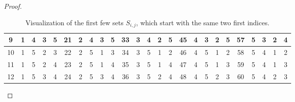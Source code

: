 \begin{proof}
\begin{table}[h]
{\begin{tabular}{||c | c c c c||c | c c c c||c | c c c c||c | c c c c||c | c c c c||}
				\hline
				9 & \cellcolor{-red!60!green}1 & \cellcolor{-red!60!green}4 & \cellcolor{-red!60!green}3 & \cellcolor{-red!60!green}5 & 21 & 2 & 4 & 3 & 5 & 33 & 3 & 4 & 2 & 5 & 45 & 4 & 3 & 2 & 5 & 57 & 5 & 3 & 2 & 4 \\ 
				\hline
				10 & \cellcolor{-red!40!green}1 & \cellcolor{-red!40!green}5 & \cellcolor{-red!40!green}2 & \cellcolor{-red!40!green}3 & 22 & 2 & 5 & 1 & 3 & 34 & 3 & 5 & 1 & 2 & 46 & 4 & 5 & 1 & 2 & 58 & 5 & 4 & 1 & 2 \\ 
				\hline
				11 & \cellcolor{-red!40!green}1 & \cellcolor{-red!40!green}5 & \cellcolor{-red!40!green}2 & \cellcolor{-red!40!green}4 & 23 & 2 & 5 & 1 & 4 & 35 & 3 & 5 & 1 & 4 & 47 & 4 & 5 & 1 & 3 & 59 & 5 & 4 & 1 & 3 \\ 
				\hline
				12 & \cellcolor{-red!40!green}1 & \cellcolor{-red!40!green}5 & \cellcolor{-red!40!green}3 & \cellcolor{-red!40!green}4 & 24 & 2 & 5 & 3 & 4 & 36 & 3 & 5 & 2 & 4 & 48 & 4 & 5 & 2 & 3 & 60 & 5 & 4 & 2 & 3 \\ 
				\hline
			\end{tabular}%
		}
		\caption{Visualization of the first few sets $S_{i,j}$, which start with the same two first indices.}
	\end{table}
	

\end{proof}
